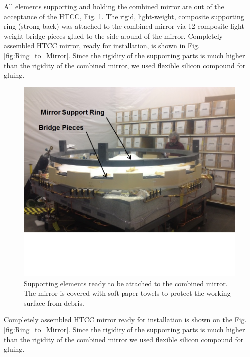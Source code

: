   All elements supporting and holding the combined mirror are out of the acceptance of the HTCC, Fig. \ref{fig:Support_Ring}. The rigid, light-weight, composite supporting ring (strong-back) was attached to the combined mirror via 12 composite light-weight bridge pieces glued to the side around of the mirror. Completely assembled HTCC mirror, ready for installation, is shown in Fig. \ref{fig:Ring_to_Mirror}. Since the rigidity of the supporting parts is much higher than the rigidity of the combined mirror, we used flexible silicon compound for gluing.
  
\begin{figure}[ht]
    \centering
    \includegraphics[width=1.0\linewidth,trim={0 5cm 0 0},clip]{images/Support_Ring.jpg}
    \caption{Supporting elements ready to be attached to the combined mirror. The mirror is covered with soft paper towels to protect the working surface from debris.}
    \label{fig:Support_Ring}
\end{figure}

  Completely assembled HTCC mirror ready for installation is shown on the Fig.\ref{fig:Ring_to_Mirror}. Since the rigidity of the supporting parts is much higher than the rigidity of the combined mirror we used flexible silicon compound for gluing.
  
